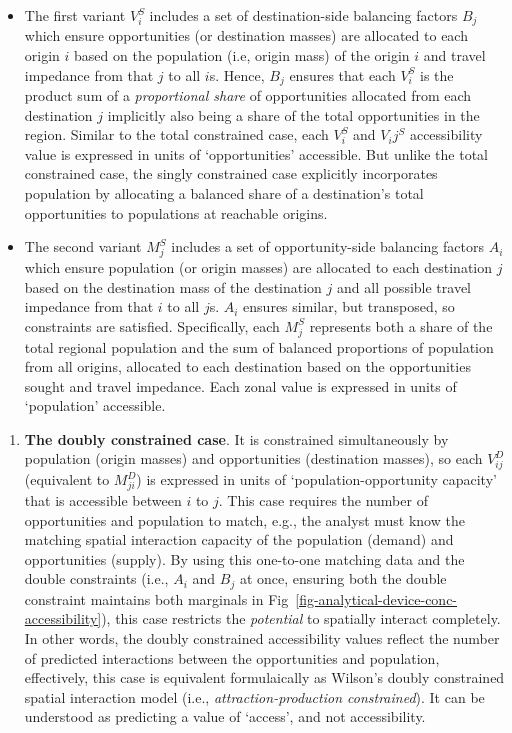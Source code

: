 \documentclass[
  10pt,
  letterpaper,
]{article}
\providecommand{\tightlist}{%
  \setlength{\itemsep}{0pt}\setlength{\parskip}{0pt}}\usepackage{longtable,booktabs,array}
\begin{document}
\begin{itemize}
\tightlist
\item
  The first variant \(V_i^S\) includes a set of destination-side
  balancing factors \(B_j\) which ensure opportunities (or destination
  masses) are allocated to each origin \(i\) based on the population
  (i.e, origin mass) of the origin \(i\) and travel impedance from that
  \(j\) to all \(i\)s. Hence, \(B_j\) ensures that each \(V_i^S\) is the
  product sum of a \emph{proportional share} of opportunities allocated
  from each destination \(j\) implicitly also being a share of the total
  opportunities in the region. Similar to the total constrained case,
  each \(V_i^S\) and \(V_ij^S\) accessibility value is expressed in
  units of `opportunities' accessible. But unlike the total constrained
  case, the singly constrained case explicitly incorporates population
  by allocating a balanced share of a destination's total opportunities
  to populations at reachable origins.
\item
  The second variant \(M_j^S\) includes a set of opportunity-side
  balancing factors \(A_i\) which ensure population (or origin masses)
  are allocated to each destination \(j\) based on the destination mass
  of the destination \(j\) and all possible travel impedance from that
  \(i\) to all \(j\)s. \(A_i\) ensures similar, but transposed, so
  constraints are satisfied. Specifically, each \(M_j^S\) represents
  both a share of the total regional population and the sum of balanced
  proportions of population from all origins, allocated to each
  destination based on the opportunities sought and travel impedance.
  Each zonal value is expressed in units of `population' accessible.
\end{itemize}

\begin{enumerate}
\def\labelenumi{\arabic{enumi}.}
\setcounter{enumi}{3}
\tightlist
\item
  \textbf{The doubly constrained case}. It is constrained simultaneously
  by population (origin masses) and opportunities (destination masses),
  so each \(V_{ij}^D\) (equivalent to \(M_{ji}^D\)) is expressed in
  units of `population-opportunity capacity' that is accessible between
  \(i\) to \(j\). This case requires the number of opportunities and
  population to match, e.g., the analyst must know the matching spatial
  interaction capacity of the population (demand) and opportunities
  (supply). By using this one-to-one matching data and the double
  constraints (i.e., \(A_i\) and \(B_j\) at once, ensuring both the
  double constraint maintains both marginals in
  Fig~\ref{fig-analytical-device-conc-accessibility}), this case
  restricts the \emph{potential} to spatially interact completely. In
  other words, the doubly constrained accessibility values reflect the
  number of predicted interactions between the opportunities and
  population, effectively, this case is equivalent formulaically as
  Wilson's doubly constrained spatial interaction model (i.e.,
  \emph{attraction-production constrained}). It can be understood as
  predicting a value of `access', and not accessibility.
\end{enumerate}
\end{document}
